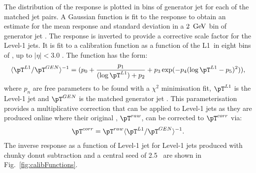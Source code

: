 The distribution of the response is plotted in bins of generator jet
\pT for each of the matched jet pairs. A Gaussian function is fit to the
response to obtain an estimate for the mean response and standard
deviation in a $2~\mathrm{\,Ge\kern -0.1em V}$ bin of generator jet \pT. The response is
inverted to provide a corrective scale factor for the Level-1 jets. It
is fit to a calibration function as a function of the L1~\pT in eight
bins of \eta, up to $|\eta|<3.0$ \cite{l1triggernote2012}. The
function has the form:
\begin{equation}
\langle \pT^{L1}/\pT^{GEN} \rangle ^{-1} =
(p_0 + \frac{p_1}{(\log\pT^{L1})+p_2} + p_3 \exp(-p_4(\log
\pT^{L1}-p_5)^2)),
\end{equation}
where $p_n$ are free parameters to be found with a $\chi^2$
minimisation fit, $\pT^{L1}$ is the Level-1 jet \pT and $\pT^{GEN}$ is
the matched generator jet \pT. This parameterisation provides a
multiplicative correction that can be applied to Level-1 jets as they
are produced online where their original \pT, $\pT^{raw}$, can be
corrected to $\pT^{corr}$ via:
\begin{equation}
 \pT^{corr}=\pT^{raw} \langle \pT^{L1}/\pT^{GEN} \rangle ^{-1}. 
\end{equation}
The inverse response as a function of Level-1 jet \pT for Level-1 jets
produced with chunky donut subtraction and a central seed of 2.5~\gev
are shown in Fig.~\ref{fig:calibFunctions}.

